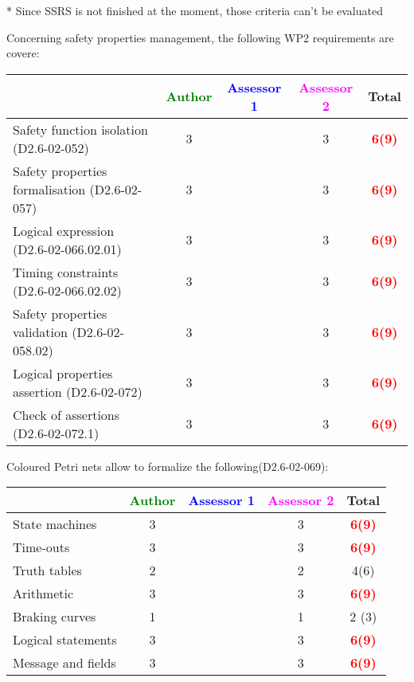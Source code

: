 \begin{assessor2}
* Since SSRS is not finished at the moment, those criteria can't be evaluated
\end{assessor2}

Concerning safety properties management, the following WP2 requirements are covere:

\begin{tabular}{|l | c | c | c | c|}
\hline
& \textcolor{green}{Author} & \textcolor{blue}{Assessor 1} & \textcolor{magenta}{Assessor 2} & Total \\
\hline 
Safety function isolation (D2.6-02-052)  & 3     & & 3     &\textcolor{red}{\textbf{6(9)}}  \\
\hline 
Safety properties formalisation (D2.6-02-057)  & 3     & & 3     &\textcolor{red}{\textbf{6(9)}}  \\
\hline
Logical expression (D2.6-02-066.02.01)  & 3     & & 3     &\textcolor{red}{\textbf{6(9)}}  \\
\hline
Timing constraints (D2.6-02-066.02.02)  & 3     & & 3     &\textcolor{red}{\textbf{6(9)}}  \\
\hline
Safety properties validation (D2.6-02-058.02)  & 3     & & 3     &\textcolor{red}{\textbf{6(9)}}  \\
\hline
Logical properties assertion (D2.6-02-072)  & 3     & & 3     &\textcolor{red}{\textbf{6(9)}}  \\
\hline
Check  of assertions (D2.6-02-072.1)  & 3     & & 3     &\textcolor{red}{\textbf{6(9)}}  \\
\hline
\end{tabular}

Coloured Petri nets allow to  formalize the following(D2.6-02-069):

\begin{tabular}{|l | c | c | c | c|}
\hline
& \textcolor{green}{Author} & \textcolor{blue}{Assessor 1} & \textcolor{magenta}{Assessor 2} & Total \\
\hline 
State machines  & 3     & & 3     &\textcolor{red}{\textbf{6(9)}}  \\
\hline
Time-outs  & 3     & & 3     &\textcolor{red}{\textbf{6(9)}}  \\
\hline
Truth tables  & 2     & & 2     &  4(6) \\
\hline
Arithmetic  & 3     & & 3     &\textcolor{red}{\textbf{6(9)}}  \\
\hline
Braking curves  & 1     & & 1     & 2 (3) \\
\hline
Logical statements & 3     & & 3     &\textcolor{red}{\textbf{6(9)}}  \\
\hline
Message and fields & 3     & & 3     &\textcolor{red}{\textbf{6(9)}}  \\
\hline
\end{tabular}

